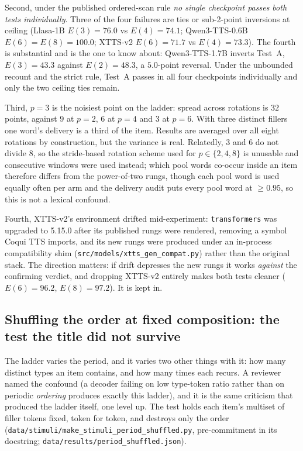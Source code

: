 \documentclass[11pt]{article}
\begin{document}
Second, under the published ordered-scan rule \emph{no single checkpoint passes
both tests individually}. Three of the four failures are ties or sub-2-point
inversions at ceiling (Llasa-1B $E(3){=}76.0$ vs $E(4){=}74.1$; Qwen3-TTS-0.6B
$E(6){=}E(8){=}100.0$; XTTS-v2 $E(6){=}71.7$ vs $E(4){=}73.3$). The fourth is
substantial and is the one to know about: Qwen3-TTS-1.7B inverts Test~A,
$E(3){=}43.3$ against $E(2){=}48.3$, a $5.0$-point reversal. Under the unbounded
recount and the strict rule, Test~A passes in all four checkpoints individually
and only the two ceiling ties remain.

Third, $p{=}3$ is the noisiest point on the ladder: spread across rotations is
$32$ points, against $9$ at $p{=}2$, $6$ at $p{=}4$ and $3$ at $p{=}6$. With
three distinct fillers one word's delivery is a third of the item. Results are
averaged over all eight rotations by construction, but the variance is real.
Relatedly, $3$ and $6$ do not divide $8$, so the stride-based rotation scheme
used for $p \in \{2,4,8\}$ is unusable and consecutive windows were used
instead; which pool words co-occur inside an item therefore differs from the
power-of-two rungs, though each pool word is used equally often per arm and the
delivery audit puts every pool word at $\ge 0.95$, so this is not a lexical
confound.

Fourth, XTTS-v2's environment drifted mid-experiment: \texttt{transformers} was
upgraded to 5.15.0 after its published rungs were rendered, removing a symbol
Coqui TTS imports, and its new rungs were produced under an in-process
compatibility shim (\texttt{src/models/xtts\_gen\_compat.py}) rather than the
original stack. The direction matters: if drift depresses the new rungs it works
\emph{against} the confirming verdict, and dropping XTTS-v2 entirely makes both
tests cleaner ($E(6){=}96.2$, $E(8){=}97.2$). It is kept in.

\subsection{Shuffling the order at fixed composition: the test the title did
not survive}

The ladder varies the period, and it varies two other things with it: how many
distinct types an item contains, and how many times each recurs. A reviewer
named the confound (a decoder failing on low type-token ratio rather than on
periodic \emph{ordering} produces exactly this ladder), and it is the same
criticism that produced the ladder itself, one level up. The test holds each
item's multiset of filler tokens fixed, token for token, and destroys only the
order (\texttt{data/stimuli/make\_stimuli\_period\_shuffled.py}, pre-commitment
in its docstring; \texttt{data/results/period\_shuffled.json}).
\end{document}

